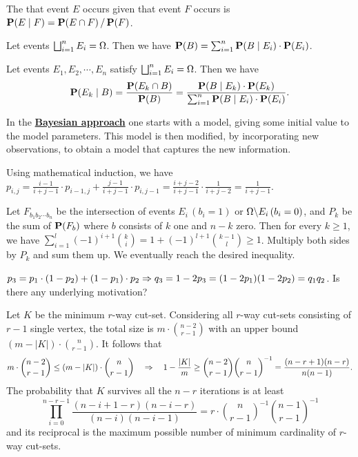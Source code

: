 \documentclass[main.tex]{subfiles}
\begin{document}
The  that event $E$ occurs given that event $F$ occurs is $\mathbf{P}(E \mid F) = \mathbf{P}(E \cap F) \,/\, \mathbf{P}(F)$.

\begin{theorem}
	Let events $\bigsqcup_{i=1}^{n} E_i = \Omega$. Then we have $\mathbf{P}(B) = \sum_{i=1}^{n} \mathbf{P}(B \mid E_i)\cdot \mathbf{P}(E_i)$. 
\end{theorem}

\begin{theorem}
	Let events $E_1,E_2,\cdots,E_n$ satisfy $\bigsqcup_{i=1}^{n} E_i = \Omega$. Then we have
	\[
		\mathbf{P}(E_k \mid B) = \frac{\mathbf{P}(E_k \cap B)}{\mathbf{P}(B)}
		= \frac{\mathbf{P}(B \mid E_k)\cdot \mathbf{P}(E_k)}{\sum_{i=1}^{n}\mathbf{P}(B \mid E_i) \cdot \mathbf{P}(E_i)}.
	\] 
\end{theorem}

In the \href{https://en.wikipedia.org/wiki/Bayesian_inference}{\bf Bayesian approach} one starts with a  model, giving some initial value to the model parameters. This model is then modified, by incorporating new observations, to obtain a  model that captures the new information.

\bigskip

Using mathematical induction, we have $p_{i,j} = \frac{i-1}{i+j-1}\cdot p_{i-1,j} + \frac{j-1}{i+j-1}\cdot p_{i,j-1} = \frac{i+j-2}{i+j-1}\cdot\frac{1}{i+j-2} = \frac{1}{i+j-1}$.

Let $F_{b_1b_2\cdots b_n}$ be the intersection of events $E_i\,(b_i=1)$ or $\Omega\backslash E_i\,(b_i=0)$, and $P_{k}$ be the sum of $\mathbf{P}(F_b)$ where $b$ consists of $k$ one and $n-k$ zero. Then for every $k \ge 1$, we have $\sum_{i=1}^{l}(-1)^{i+1}\binom{k}{i} = 1 + (-1)^{l+1}\binom{k-1}{l} \ge 1$. Multiply both sides by $P_k$ and sum them up. We eventually reach the desired inequality.

$p_3 = p_1\cdot (1-p_2) + (1-p_1) \cdot p_2 \Rightarrow q_3 = 1-2p_3 = (1-2p_1)(1-2p_2) = q_1q_2$. Is there any underlying motivation?

 \href{https://en.wikipedia.org/wiki/Karger's_algorithm}{} Let $K$ be the minimum $r$-way cut-set. Considering all $r$-way cut-sets consisting of $r-1$ single vertex, the total size is $m\cdot \binom{n-2}{r-1}$ with an upper bound $(m-|K|)\cdot \binom{n}{r-1}$. It follows that
	\[
	m \cdot \binom{n-2}{r-1} \le (m-|K|)\cdot \binom{n}{r-1} \quad\Rightarrow\quad 1-\frac {|K|}{m} \ge \binom{n-2}{r-1}\binom n{r-1}^{-1}=\frac{(n-r+1)(n-r)}{n(n-1)}.
	\]
The probability that $K$ survives all the $n-r$ iterations is at least
	\[
		\prod_{i=0}^{n-r-1}\frac{(n-i+1-r)(n-i-r)}{(n-i)(n-i-1)} = r\cdot \binom{n}{r-1}^{-1}\binom{n-1}{r-1}^{-1}
	\]
and its reciprocal is the maximum possible number of minimum cardinality of $r$-way cut-sets.
\end{document}
